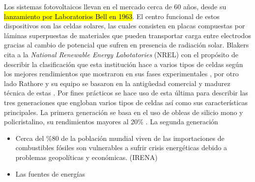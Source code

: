 Los sistemas fotovoltaicos llevan en el mercado cerca de 60 años, desde su \hl{lanzamiento por Laboratorios Bell en 1963}. El centro funcional de estos 
dispositivos son las celdas solares, las cuales consisten en placas compuestas por láminas superpuestas de materiales que pueden transportar carga 
entre electrodos gracias al cambio de potencial que sufren en presencia de radiación solar. Blakers cita a la 
\textit{National Renewable Energy Labotatories} (NREL) con el propósito de describir la clasificación que esta institución hace a varios tipos de celdas 
según los mejores rendimientos que mostraron en sus fases experimentales \cite{blakers2013}, por otro lado Rathore y su equipo se basaron en la antigûedad 
comercial y madurez técnica de estas \cite{rathore2021}. Por fines prácticos se hace uso de esta última para describir las tres generaciones que engloban
varios tipos de celdas así como sus características principales. La primera generación se basa en el uso de obleas de silicio mono y policristalino, su rendimientos mayores al
20\% \cite{gul2016}. La segunda generación 






\begin{itemize}
    \item Cerca del \%80 de la población mundial viven de las importaciones 
     de combustibles fósiles son vulnerables a sufrir crisis energéticas
     debido a problemas geopolíticas y económicas.
     (IRENA)
    
    \item Las fuentes de energías 
\end{itemize}
